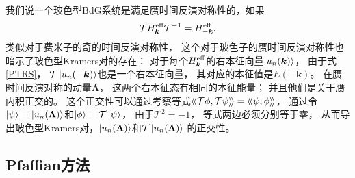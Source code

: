 我们说一个玻色型BdG系统是满足赝时间反演对称性的，如果
\begin{equation}
	\mathcal{T} H^{\text{eff}}_{\boldsymbol k} \mathcal{T}^{-1}=H_{-\boldsymbol k}^{\text{eff}}.\label{PTRS}
\end{equation}
类似对于费米子的奇的时间反演对称性，
这个对于玻色子的赝时间反演对称性也暗示了玻色型Kramers对的存在：
对于每个$H^{\text{eff}}_{\boldsymbol k}$的右本征向量$\ket{u_n(\boldsymbol k)}$，
由于式\eqref{PTRS}，
$\mathcal{T}\ket{u_n(-\boldsymbol k)}$也是一个右本征向量，
其对应的本征值是$E(-\boldsymbol k)$。
在赝时间反演对称的动量$\boldsymbol{\Lambda}$，
这两个右本征态有相同的本征能量；
并且他们是关于赝内积正交的\cite{Kondo2019}。
这个正交性可以通过考察等式$\langle\!\langle \mathcal{T}\phi,\mathcal{T}\psi \rangle\!\rangle=\langle\!\langle \psi,\phi \rangle\!\rangle$，
通过令$\ket{\psi}=\ket{u_n(\boldsymbol{\Lambda})}$和$\ket{\phi}=\mathcal{T} \ket{\psi}$，
由于$\mathcal{T}^{2}=-1$，
等式两边必须分别等于零，
从而导出玻色型Kramers对，$\ket{u_n(\boldsymbol{\Lambda})}$和$\mathcal{T} \ket{u_n(\boldsymbol{\Lambda})}$ 的正交性。

\subsection{Pfaffian方法}

